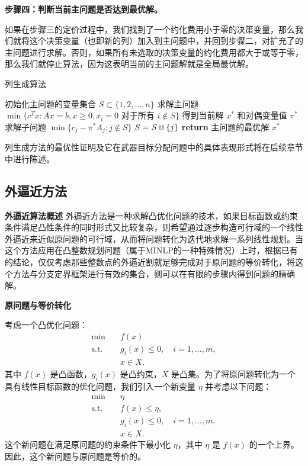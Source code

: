 \textbf{步骤四：判断当前主问题是否达到最优解。}

如果在步骤三的定价过程中，我们找到了一个约化费用小于零的决策变量，那么我们就将这个决策变量（也即新的列）加入到主问题中，并回到步骤二，对扩充了的主问题进行求解。否则，如果所有未选取的决策变量的约化费用都大于或等于零，那么我们就停止算法，因为这表明当前的主问题解就是全局最优解。

\begin{algorithm}[!htbp]
    \small
    \caption{列生成算法}\label{alg:column_generation}
    \begin{algorithmic}[1]
        \State 初始化主问题的变量集合 $S \subset \{1,2,\ldots,n\}$
        \Repeat
            \State 求解主问题 $\min\{c^T x : Ax = b, x \geq 0, x_i = 0 \text{ 对于所有 } i \notin S\}$
            \State 得到当前解 $x^*$ 和对偶变量值 $\pi^*$
            \State 求解子问题 $\min\{c_j - \pi^* A_j : j \notin S\}$
                \State $S = S \Cup \{j\}$
            \EndIf
        \State \textbf{return} 主问题的最优解 $x^*$
        \EndProcedure
    \end{algorithmic}
\end{algorithm}

列生成方法的最优性证明及它在武器目标分配问题中的具体表现形式将在后续章节中进行陈述。

\subsection{外逼近方法}
\textbf{外逼近算法概述}
外逼近方法是一种求解凸优化问题的技术，如果目标函数或约束条件满足凸性条件的同时形式又比较复杂，则希望通过逐步构造可行域的一个线性外逼近来近似原问题的可行域，从而将问题转化为迭代地求解一系列线性规划。当这个方法应用在凸整数规划问题（属于MINLP的一种特殊情况）上时，根据已有的结论，仅仅考虑那些整数点的外逼近割就足够完成对于原问题的等价转化，将这个方法与分支定界框架进行有效的集合，则可以在有限的步骤内得到问题的精确解。

\textbf{原问题与等价转化}

考虑一个凸优化问题：
\begin{align*}
    \min \quad & f(x) \\
    \text{s.t.} \quad & g_i(x) \leq 0, \quad i = 1, \ldots, m, \\
                       & x \in X,
\end{align*}
其中 $f(x)$ 是凸函数，$g_i(x)$ 是凸约束，$X$ 是凸集。为了将原问题转化为一个具有线性目标函数的优化问题，我们引入一个新变量 $\eta$ 并考虑以下问题：
\begin{align*}
    \min \quad & \eta \\
    \text{s.t.} \quad & f(x) \leq \eta, \\
                       & g_i(x) \leq 0, \quad i = 1, \ldots, m, \\
                       & x \in X.
\end{align*}
这个新问题在满足原问题的约束条件下最小化 $\eta$，其中 $\eta$ 是 $f(x)$ 的一个上界。因此，这个新问题与原问题是等价的。

